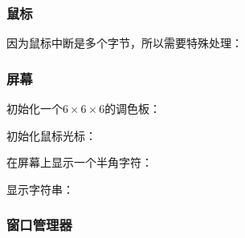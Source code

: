 {\linespread{1}}

{\linespread{1}}
{\linespread{1}}

\subsubsection{鼠标}
\label{subs:鼠标}

{\linespread{1}}

{\linespread{1}}

因为鼠标中断是多个字节，所以需要特殊处理：
{\linespread{1}}

\subsubsection{屏幕}
\label{subs:屏幕}

初始化一个$6\times6\times6$的调色板：
{\linespread{1}}

初始化鼠标光标：
{\linespread{1}}

在屏幕上显示一个半角字符：
{\linespread{1}}

显示字符串：
{\linespread{1}}

\subsubsection{窗口管理器}
\label{subs:窗口管理器}

{\linespread{1}}

{\linespread{1}}
{\linespread{1}}

